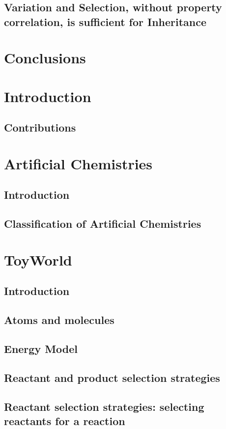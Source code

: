 \documentclass[]{report}
\begin{document}
\section{Variation and Selection, without property correlation, is sufficient for Inheritance}

\chapter{Conclusions}

\chapter{Introduction}\label{part-two}
\section{Contributions}

\chapter{Artificial Chemistries}
\section{Introduction}
\section{Classification of Artificial Chemistries}

\chapter{ToyWorld}
\section{Introduction}
\section{Atoms and molecules}
\section{Energy Model}
\section{Reactant and product selection strategies}
\section{Reactant selection strategies: selecting reactants for a reaction}
\end{document}
